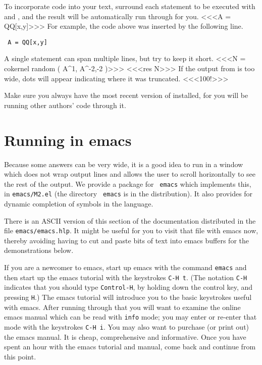 To incorporate \Mtwo code into your text, surround each statement to be
executed with \lll{} and \rrr, and the result will be automatically run
through \Mtwo for you.
<<<A = QQ[x,y]>>>
For example, the code above was inserted by the following line.
\par\smallskip
\centerline{\tt
\lll A = QQ[x,y]\rrr
}
\smallskip\noindent
A single statement can span multiple lines, but try to keep it short.
<<<N = cokernel random (
        A^1, 
        A^{-2,-2}
        )>>>
<<<res N>>>
If the output from \Mtwo is too wide, dots will appear indicating
where it was truncated. 
<<<100!>>>

Make sure you always have the most recent version of \Mtwo installed, for
you will be running other authors' code through it.

\section{Running \Mtwo in emacs}

Because some answers can be very wide, it is a good idea to run \Mtwo in
a window which does not wrap output lines and allows the user to scroll
horizontally to see the rest of the output.  We provide a package for {\tt
{}emacs} which implements this, in {\tt {}emacs/M2.el} (the directory {\tt
emacs} is in the \Mtwo distribution).  It also provides for dynamic
completion of symbols in the language.

There is an ASCII version of this section of the documentation distributed
in the file {\tt {}emacs/emacs.hlp}.  It might be useful for you to visit
that file with emacs now, thereby avoiding having to cut and paste bits of
text into emacs buffers for the demonstrations below.

If you are a newcomer to emacs, start up emacs with the command 
{\tt {}emacs} and then start up the emacs tutorial with the keystrokes 
{\tt {}C-H\ t}.  (The notation {\tt {}C-H} indicates that you should type 
{\tt {}Control-H}, by holding down the control key, 
and pressing {\tt {}H}.)  The emacs tutorial will introduce you to the
basic keystrokes useful with emacs.  After running through that you will want
to examine the online emacs manual which can be read with {\tt {}info}
mode; you may enter or re-enter that mode with the keystrokes {\tt {}C-H\ i}.  
You may also want to purchase (or print out) the emacs manual.  It is cheap,
comprehensive and informative.  Once you have spent an hour with the emacs
tutorial and manual, come back and continue from this point.

